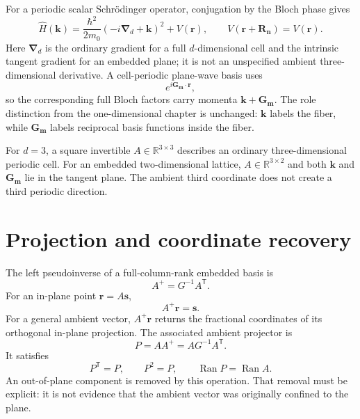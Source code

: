 For a periodic scalar Schr\"odinger operator, conjugation by the Bloch phase
gives
\begin{equation}
  \widehat H(\mathbf k)
  =\frac{\hbar^2}{2m_0}
   \left(-i\boldsymbol\nabla_{\!d}+\mathbf k\right)^2
   +V(\mathbf r),
  \qquad
  V(\mathbf r+\mathbf R_{\mathbf n})=V(\mathbf r).
  \label{eq:training-higher-dimensional-fiber-operator}
\end{equation}
Here $\boldsymbol\nabla_d$ is the ordinary gradient for a full
$d$-dimensional cell and the intrinsic tangent gradient for an embedded plane;
it is not an unspecified ambient three-dimensional derivative.
A cell-periodic plane-wave basis uses
\begin{equation}
  e^{i\mathbf G_{\mathbf m}\cdot\mathbf r},
\end{equation}
so the corresponding full Bloch factors carry momenta
$\mathbf k+\mathbf G_{\mathbf m}$. The role distinction from the
one-dimensional chapter is unchanged: $\mathbf k$ labels the fiber, while
$\mathbf G_{\mathbf m}$ labels reciprocal basis functions inside the fiber.

For $d=3$, a square invertible $A\in\mathbb R^{3\times3}$ describes an ordinary
three-dimensional periodic cell. For an embedded two-dimensional lattice,
$A\in\mathbb R^{3\times2}$ and both $\mathbf k$ and
$\mathbf G_{\mathbf m}$ lie in the tangent plane. The ambient third coordinate
does not create a third periodic direction.

\section{Projection and coordinate recovery}

The left pseudoinverse of a full-column-rank embedded basis is
\begin{equation}
  A^{+}=G^{-1}A^{\mathsf T}.
  \label{eq:training-left-pseudoinverse}
\end{equation}
For an in-plane point $\mathbf r=A\mathbf s$,
\begin{equation}
  A^{+}\mathbf r=\mathbf s.
  \label{eq:training-fractional-recovery}
\end{equation}
For a general ambient vector, $A^{+}\mathbf r$ returns the fractional
coordinates of its orthogonal in-plane projection. The associated ambient
projector is
\begin{equation}
  P=AA^{+}=AG^{-1}A^{\mathsf T}.
  \label{eq:training-ambient-projector}
\end{equation}
It satisfies
\begin{equation}
  P^{\mathsf T}=P,
  \qquad
  P^2=P,
  \qquad
  \operatorname{Ran}P=\operatorname{Ran}A.
  \label{eq:training-projector-identities}
\end{equation}
An out-of-plane component is removed by this operation. That removal must be
explicit: it is not evidence that the ambient vector was originally confined
to the plane.


